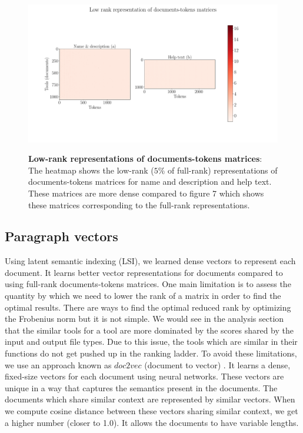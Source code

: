 \begin{figure}[h]
\begin{centering}
    {\includegraphics[scale=0.35]{figures/Document_tokens_low_rank.pdf}}
    \caption[Low-rank representations of documents-tokens matrices]{\textbf{Low-rank representations of documents-tokens matrices}: The heatmap shows the low-rank ($5\%$ of full-rank) representations of documents-tokens matrices for name and description and help text. These matrices are more dense compared to figure 7 which shows these matrices corresponding to the full-rank representations.}
\end{centering}
\end{figure}

\subsection{Paragraph vectors}
Using latent semantic indexing (LSI), we learned dense vectors to represent each document. It learns better vector representations for documents compared to using full-rank documents-tokens matrices. One main limitation is to assess the quantity by which we need to lower the rank of a matrix in order to find the optimal results. There are ways to find the optimal reduced rank by optimizing the Frobenius norm but it is not simple. We would see in the analysis section that the similar tools for a tool are more dominated by the scores shared by the input and output file types. Due to this issue, the tools which are similar in their functions do not get pushed up in the ranking ladder. To avoid these limitations, we use an approach known as $doc2vec$ (document to vector) \cite{DBLP:journals/corr/LeM14}. It learns a dense, fixed-size vectors for each document using neural networks. These vectors are unique in a way that captures the semantics present in the documents. The documents which share similar context are represented by similar vectors. When we compute cosine distance between these vectors sharing similar context, we get a higher number (closer to 1.0). It allows the documents to have variable lengths.


